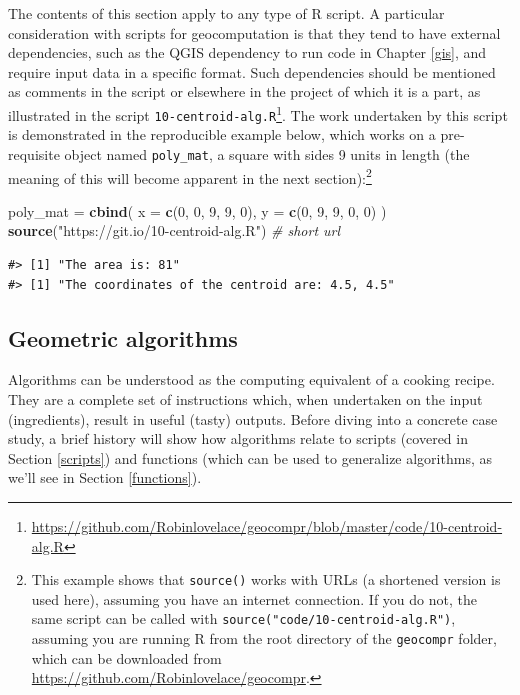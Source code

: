 \documentclass[]{krantz}
\newenvironment{Shaded}{\begin{snugshade}}{\end{snugshade}}
\newcommand{\CommentTok}[1]{\textcolor[rgb]{0.37,0.37,0.37}{\textit{#1}}}
\newcommand{\DataTypeTok}[1]{\textcolor[rgb]{0.27,0.27,0.27}{#1}}
\newcommand{\DecValTok}[1]{\textcolor[rgb]{0.06,0.06,0.06}{#1}}
\newcommand{\KeywordTok}[1]{\textcolor[rgb]{0.27,0.27,0.27}{\textbf{#1}}}
\newcommand{\NormalTok}[1]{#1}
\newcommand{\StringTok}[1]{\textcolor[rgb]{0.5,0.5,0.5}{#1}}
\let\rmarkdownfootnote\footnote%
\def\footnote{\protect\rmarkdownfootnote}
\renewcommand{\href}[2]{#2\footnote{\url{#1}}}
\begin{document}
The contents of this section apply to any type of R script.
A particular consideration with scripts for geocomputation is that they tend to have external dependencies, such as the QGIS dependency to run code in Chapter \ref{gis}, and require input data in a specific format.
Such dependencies should be mentioned as comments in the script or elsewhere in the project of which it is a part, as illustrated in the script \href{https://github.com/Robinlovelace/geocompr/blob/master/code/10-centroid-alg.R}{\texttt{10-centroid-alg.R}}.
The work undertaken by this script is demonstrated in the reproducible example below, which works on a pre-requisite object named \texttt{poly\_mat}, a square with sides 9 units in length (the meaning of this will become apparent in the next section):\footnote{This example shows that \texttt{source()} works with URLs (a shortened version is used here), assuming you have an internet connection.
  If you do not, the same script can be called with \texttt{source("code/10-centroid-alg.R")}, assuming you are running R from the root directory of the \texttt{geocompr} folder, which can be downloaded from \url{https://github.com/Robinlovelace/geocompr}.}

\begin{Shaded}
\begin{Highlighting}[]
\NormalTok{poly_mat =}\StringTok{ }\KeywordTok{cbind}\NormalTok{(}
  \DataTypeTok{x =} \KeywordTok{c}\NormalTok{(}\DecValTok{0}\NormalTok{, }\DecValTok{0}\NormalTok{, }\DecValTok{9}\NormalTok{, }\DecValTok{9}\NormalTok{, }\DecValTok{0}\NormalTok{),}
  \DataTypeTok{y =} \KeywordTok{c}\NormalTok{(}\DecValTok{0}\NormalTok{, }\DecValTok{9}\NormalTok{, }\DecValTok{9}\NormalTok{, }\DecValTok{0}\NormalTok{, }\DecValTok{0}\NormalTok{)}
\NormalTok{)}
\KeywordTok{source}\NormalTok{(}\StringTok{"https://git.io/10-centroid-alg.R"}\NormalTok{) }\CommentTok{# short url}
\end{Highlighting}
\end{Shaded}

\begin{verbatim}
#> [1] "The area is: 81"
#> [1] "The coordinates of the centroid are: 4.5, 4.5"
\end{verbatim}

\hypertarget{geometric-algorithms}{%
\subsection{Geometric algorithms}\label{geometric-algorithms}}

Algorithms can be understood as the computing equivalent of a cooking recipe.
They are a complete set of instructions which, when undertaken on the input (ingredients), result in useful (tasty) outputs.
Before diving into a concrete case study, a brief history will show how algorithms relate to scripts (covered in Section \ref{scripts}) and functions (which can be used to generalize algorithms, as we'll see in Section \ref{functions}).
\end{document}
